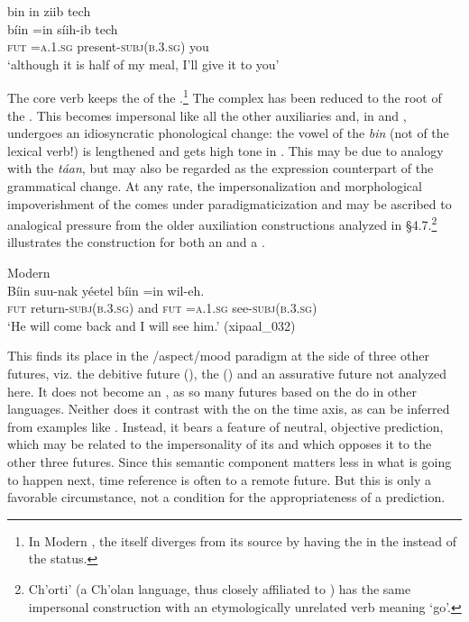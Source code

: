 \documentclass[output=paper]{langsci/langscibook}
\begin{document}
  bin   in       ziib                 tech\\
\gll        bíin  =in      síih-ib              tech\\
\textsc{fut}   \textsc{=a.1.sg}    present-\textsc{subj(b.3.sg)}    you\\
\glt ‘although it is half of my meal, I’ll give it to you’ \citep[§299, p.129]{Beltrán1746} 
\z

The core verb keeps the  of the .\footnote{\label{fnt:ftn43}In Modern  , the  itself diverges from its source by having the  in the  instead of the  status.} The  complex has been reduced to the root of the . This becomes impersonal like all the other auxiliaries and, in  and , undergoes an idiosyncratic phonological change: the vowel of the  \textit{bin} (not of the lexical verb!) is lengthened and gets high tone in . This may be due to analogy with the  \textit{táan}, but may also be regarded as the expression counterpart of the grammatical change. At any rate, the impersonalization and morphological impoverishment of the  comes under paradigmaticization and may be ascribed to analogical pressure from the older auxiliation constructions analyzed in §4.7.\footnote{Ch'orti' (a Ch'olan language, thus closely affiliated to ) has the same impersonal construction with an etymologically unrelated verb meaning `go'.}  illustrates the construction for both an  and a .


\ea\label{ex:lehmann:66}
Modern  \\
\gll       Bíin    suu-nak          yéetel  bíin  =in      wil-eh.\\
  \textsc{fut}    return-\textsc{subj(b.3.sg)}  and    \textsc{fut}   \textsc{=a.1.sg}    see-\textsc{subj(b.3.sg)}\\
\glt ‘He will come back and I will see him.' (xipaal\_032)
\z

This  finds its place in the /aspect/mood paradigm at the side of three other futures, viz. the debitive future (), the  () and an assurative future not analyzed here. It does not become an , as so many futures based on the  do in other languages. Neither does it contrast with the  on the time axis, as can be inferred from examples like . Instead, it bears a feature of neutral, objective prediction, which may be related to the impersonality of its  and which opposes it to the other three futures. Since this semantic component matters less in what is going to happen next, time reference is often to a remote future. But this is only a favorable circumstance, not a condition for the appropriateness of a prediction.
\end{document}
